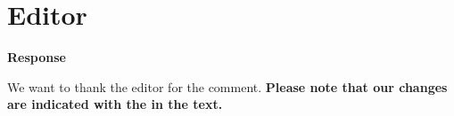 \section{Editor}


\textbf{Response}

We want to thank the editor for the comment. \textbf{Please note that our changes are indicated with the  in the text.} 

\newpage